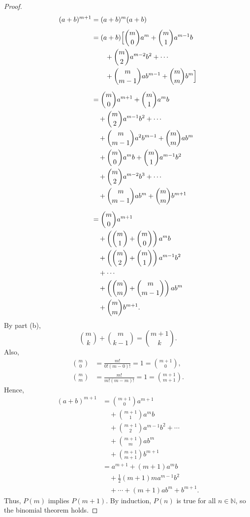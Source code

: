 \documentclass{article}
\theoremstyle{definition}
\begin{document}
\begin{proof}
\begin{align*}
(a+b)^{m+1}
&=(a+b)^m(a+b)\\[4pt]
&=(a+b)\Bigl[
   \binom{m}{0}a^m+\binom{m}{1}a^{m-1}b\\
&\qquad+\binom{m}{2}a^{m-2}b^2+\cdots\\
&\qquad+\binom{m}{m-1}ab^{m-1}+\binom{m}{m}b^m
   \Bigr]\\[6pt]
&=\binom{m}{0}a^{m+1}+\binom{m}{1}a^mb\\
&\quad+\binom{m}{2}a^{m-1}b^2+\cdots\\
&\quad+\binom{m}{m-1}a^2b^{m-1}+\binom{m}{m}ab^m\\
&\quad+\binom{m}{0}a^mb+\binom{m}{1}a^{m-1}b^2\\
&\quad+\binom{m}{2}a^{m-2}b^3+\cdots\\
&\quad+\binom{m}{m-1}ab^m+\binom{m}{m}b^{m+1}\\[6pt]
&=\binom{m}{0}a^{m+1}\\
&\quad+\left(\binom{m}{1}+\binom{m}{0}\right)a^mb\\
&\quad+\left(\binom{m}{2}+\binom{m}{1}\right)a^{m-1}b^2\\
&\quad+\cdots\\
&\quad+\left(\binom{m}{m}+\binom{m}{m-1}\right)ab^m\\
&\quad+\binom{m}{m}b^{m+1}.
\end{align*}
By part (b),
\[
\binom{m}{k}+\binom{m}{k-1}=\binom{m+1}{k}.
\]
Also,
\begin{align*}
\binom{m}{0}
&=\frac{m!}{0!(m-0)!}=1=\binom{m+1}{0},\\[6pt]
\binom{m}{m}
&=\frac{m!}{m!(m-m)!}=1=\binom{m+1}{m+1}.
\end{align*}
Hence,
\begin{align*}
(a+b)^{m+1}
&=\binom{m+1}{0}a^{m+1}\\
&\quad+\binom{m+1}{1}a^mb\\
&\quad+\binom{m+1}{2}a^{m-1}b^2+\cdots\\
&\quad+\binom{m+1}{m}ab^m\\
&\quad+\binom{m+1}{m+1}b^{m+1}\\[6pt]
&=a^{m+1}+(m+1)a^mb\\
&\quad+\frac12(m+1)m a^{m-1}b^2\\
&\quad+\cdots+(m+1)ab^m+b^{m+1}.
\end{align*}
Thus, \(P(m)\) implies \(P(m+1)\).
By induction, \(P(n)\) is true for all \(n\in\mathbb{N}\), so the binomial theorem holds.
\end{proof}
\end{document}
